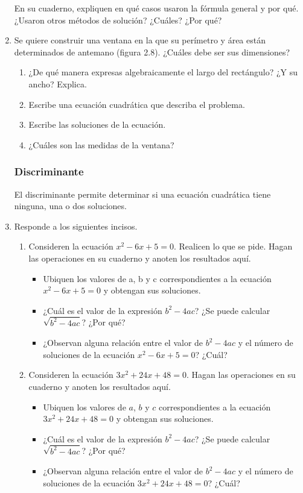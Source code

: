 \documentclass[11pt]{book}
\begin{document}
\begin{enumerate}
        En su cuaderno, expliquen en qué casos usaron la fórmula general y por qué. ¿Usaron otros métodos de solución? ¿Cuáles? ¿Por qué?

  \item Se quiere construir una ventana en la que su perímetro y área
        están determinados de antemano (figura 2.8). ¿Cuáles debe ser sus dimensiones?
        \begin{enumerate}
          \item ¿De qué manera expresas algebraicamente el largo del rectángulo? ¿Y su ancho? Explica.
          \item Escribe una ecuación cuadrática que describa el problema.
          \item Escribe las soluciones de la ecuación.
          \item ¿Cuáles son las medidas de la ventana?
        \end{enumerate}

        \newpage

        \subsubsection{Discriminante}
        El discriminante permite determinar si una ecuación cuadrática tiene ninguna, una o
        dos soluciones.

  \item Responde a los siguientes incisos.
        \begin{enumerate}
          \item Consideren la ecuación $x^2 - 6x + 5 = 0$. Realicen lo que se pide. Hagan las operaciones en su cuaderno y anoten los resultados aquí.
                \begin{itemize}
                  \item Ubiquen los valores de a, b y c correspondientes a la ecuación $x^2 - 6x + 5 = 0$ y obtengan sus soluciones.
                  \item ¿Cuál es el valor de la expresión $b^2 - 4ac$? ¿Se puede calcular $\sqrt{b^2 - 4ac}$? ¿Por qué?
                  \item ¿Observan alguna relación entre el valor de $b^2 - 4ac$ y el número de soluciones de la ecuación $x^2 - 6x + 5 = 0$? ¿Cuál?
                \end{itemize}

          \item Consideren la ecuación $3x^2 + 24x + 48 = 0$. Hagan las operaciones en su cuaderno y anoten los resultados aquí.
                \begin{itemize}
                  \item Ubiquen los valores de $a$, $b$ y $c$ correspondientes a la ecuación $3x^2 + 24x + 48 = 0$ y obtengan sus soluciones.
                  \item ¿Cuál es el valor de la expresión $b^2 - 4ac$? ¿Se puede calcular $\sqrt{b^2 - 4ac}$? ¿Por qué?
                  \item ¿Observan alguna relación entre el valor de $b^2 - 4ac$ y el número de soluciones de la ecuación $3x^2 + 24x + 48 = 0$? ¿Cuál?
                \end{itemize}


\end{enumerate}
\end{enumerate}
\end{document}
